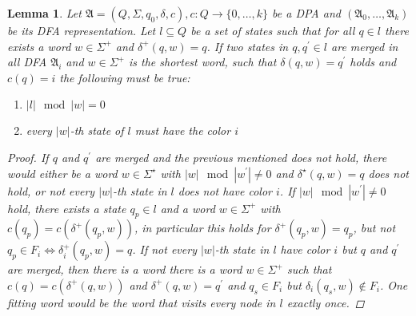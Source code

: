 \documentclass[10pt]{article}
\theoremstyle{definition}
\theoremstyle{plain}
\newtheorem{lemma}{Lemma}
\theoremstyle{remark}
\begin{document}
\begin{lemma}
  Let $\mathfrak{A}=(Q,\Sigma,q_0,\delta,c),c:Q\rightarrow \{0,\dots,k\}$ be a DPA and $(\mathfrak{A}_0,\dots,\mathfrak{A}_k)$ be its DFA representation. Let $l\subseteq Q$ be a set of states such that for all $q\in l$ there exists a word $w\in\Sigma^+$ and $\delta^+(q,w)=q$. 
  If two states in $q,q^\prime \in l$ are merged in all DFA $\mathfrak{A}_i$ and $w \in \Sigma^+$ is the shortest word, such that $\delta(q,w)=q^\prime$ holds and $c(q)=i$ the following must be true:
  \begin{enumerate}
    \item $|l| \mod |w| = 0$
    \item every $|w|$-th state of $l$ must have the color $i$
  \end{enumerate}
  \begin{proof}
  If $q$ and $q^\prime$ are merged and the previous mentioned does not hold, there would either be a word $w\in\Sigma^\star$ with $|w| \mod |w^\prime| \neq 0$ and $\delta^\star(q,w)=q$ does not hold, or not every $|w|$-th state in $l$ does not have color $i$. If $|w| \mod |w^\prime| \neq 0$ hold, there exists a state $q_p\in l$ and a word $w\in\Sigma^+$ with $c(q_p)=c(\delta^+(q_p,w))$, in particular this holds for $\delta^+(q_p,w)=q_p$, but not $q_p\in F_i \Leftrightarrow \delta^+_i(q_p,w)=q$. If not every $|w|$-th state in $l$ have color $i$ but $q$ and $q^\prime$ are merged, then there is a word there is a word $w\in\Sigma^+$ such that $c(q)=c(\delta^+(q,w))$ and $\delta^+(q,w)=q^\prime$ and $q_s\in F_i$ but $\delta_i(q_s,w)\not\in F_i$. One fitting word would be the word that visits every node in $l$ exactly once.
  \end{proof}
\end{lemma}
\end{document}
